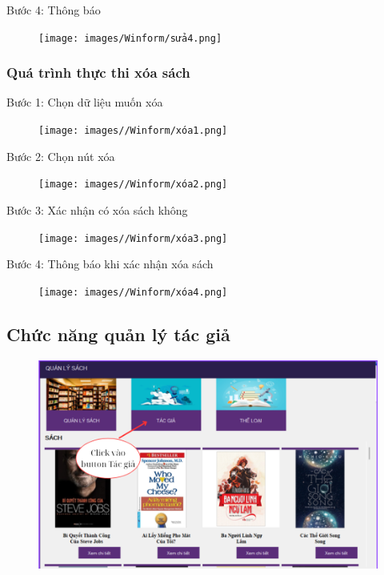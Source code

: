 \documentclass{article}
\begin{document}
Bước 4: Thông báo 
\begin{figure} [H]
    \centering
    \texttt{[image: images/Winform/sửa4.png]}
    \label{fig:enter-label}
\end{figure}

\subsubsection{Quá trình thực thi xóa sách}
Bước 1: Chọn dữ liệu muốn xóa
\begin{figure} [H]
    \centering
    \texttt{[image: images//Winform/xóa1.png]}
    \label{fig:enter-label}
\end{figure}

Bước 2: Chọn nút xóa
\begin{figure} [H]
    \centering
    \texttt{[image: images//Winform/xóa2.png]}
    \label{fig:enter-label}
\end{figure}

Bước 3: Xác nhận có xóa sách không
\begin{figure} [H]
    \centering
    \texttt{[image: images//Winform/xóa3.png]}
    \label{fig:enter-label}
\end{figure}

Bước 4: Thông báo khi xác nhận xóa sách
\begin{figure} [H]
    \centering
    \texttt{[image: images//Winform/xóa4.png]}
    \label{fig:enter-label}
\end{figure}

\subsection{Chức năng quản lý tác giả}
\begin{figure} [H]
    \centering
    \includegraphics[width=0.8\linewidth]{images//Winform/tác giả.png}
    \label{fig:enter-label}
\end{figure}
\end{document}
